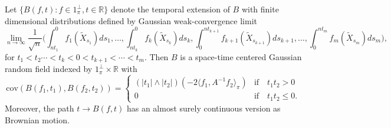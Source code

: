 \documentclass[11pt]{article}
\numberwithin{equation}{section}
\theoremstyle{definition}
\theoremstyle{remark}
\theoremstyle{definition}
\begin{document}
\begin{thm}\label{extendtime}
Let $\{B(f,t):f\in 1_\pi^\perp, t\in\mathbb{R}\}$ denote the
temporal extension of $B$ with finite dimensional
distributions defined by Gaussian weak-convergence limit 
\begin{equation}
\lim_{n\to\infty}\frac{1}{\sqrt{n}}\bigg(\int_{nt_1}^0f_1(\tilde{X}_{s_1})ds_1,\dots,\int_{nt_k}^0f_k(\tilde{X}_{s_k})ds_k,
 \int_{0}^{nt_{k+1}}f_{k+1}(\tilde{X}_{s_{k+1}})ds_{k+1},\dots,\int_0^{nt_m}f_m(\tilde{X}_{s_m})ds_m\bigg),
\end{equation}
for $t_1<t_2\cdots<t_k<0<t_{k+1}<\cdots< t_m$.
 Then ${B}$ is a space-time
centered 
Gaussian random field indexed by $1_\pi^\perp\times\mathbb{R}$
with 
 \begin{equation}
 \text{cov}(B(f_1,t_1),B(f_2,t_2))
 =
 \begin{cases} (|t_1|\wedge|t_2|)(-2\langle f_1, A^{-1}f_2\rangle_\pi)
 & \text{if}\quad t_1t_2 >0\\
 0 & \text{if}\quad t_1t_2\le 0.
 \end{cases}
 \end{equation}
 Moreover, 
 the path $t\to B(f,t)$ has an
 almost surely continuous version as  Brownian motion.
\end{thm}
\end{document}
